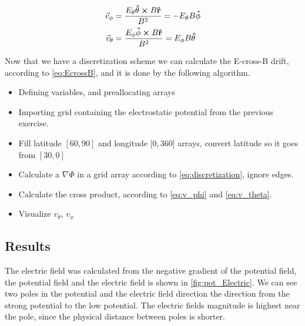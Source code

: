 \documentclass[x11names]{article}
\renewcommand{\va}{\vec}
\begin{document}
    \begin{align}
      \va{v}_\phi &= \frac{E_\theta\vu{\theta} \cross B\vu{r}}{B^2} = -E_\theta B \vu{\phi} \label{eq:v_phi}
      \\
      \va{v}_\theta &= \frac{E_\phi\vu{\phi} \cross B\vu{r}}{B^2} = E_\phi B \vu{\theta} \label{eq:v_theta}
    \end{align}



    Now that we have a discretization scheme we can calculate the E-cross-B drift, according to \cref{eq:EcrossB}, and it is done by the following algorithm.

    \begin{itemize}
      \item Defining variables, and preallocating arrays
      \item Importing grid containing the electrostatic potential from the previous exercise.
      \item Fill latitude \([60,90]\) and longitude [\(0,360\)] arrays, convert latitude so it goes from \([30,0]\)
      \item Calculate a \(\nabla \Phi\) in a grid array according to \cref{eq:discretization}, ignore edges.
      \item Calculate the cross product, according to \cref{eq:v_phi} and \cref{eq:v_theta}.
      \item Visualize \(v_\theta\), \(v_\phi\) 
    \end{itemize}

\subsection{Results}
  The electric field was calculated from the negative gradient of the potential field, the potential field and the electric field is shown in \cref{fig:pot_Electric}. We can see two poles in the potential and the electric field direction the direction from the strong potential to the low potential. The electric fields magnitude is highest near the pole, since the physical distance between poles is shorter.
  \\ \\
\end{document}
